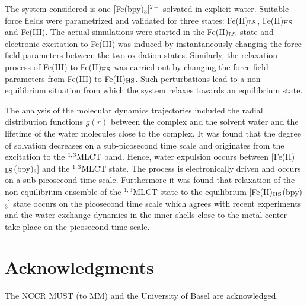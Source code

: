 \documentclass[journal=jacsat,manuscript=article]{achemso}
\begin{document}
The system considered is one [Fe(bpy)$_3$]$^{2+}$ solvated in explicit
water.\cite{das:2016} Suitable force fields were parametrized and
validated for three states: Fe(II)$\rm _{LS}$, Fe(II)$\rm _{HS}$ and
Fe(III). The actual simulations were started in the Fe(II)$\rm _{LS}$
state and electronic excitation to Fe(III) was induced by
instantaneously changing the force field parameters between the two
oxidation states. Similarly, the relaxation process of Fe(III) to
Fe(II)$\rm_{HS}$ was carried out by changing the force field
parameters from Fe(III) to Fe(II)$\rm _{HS}$. Such perturbations lead
to a non-equilibrium situation from which the system relaxes towards
an equilibrium state.

The analysis of the molecular dynamics trajectories included the
radial distribution functions $g(r)$ between the complex and the
solvent water and the lifetime of the water molecules close to the
complex. It was found\cite{das:2016} that the degree of solvation
decreases on a sub-picosecond time scale and originates from the
excitation to the $^{1,3}$MLCT band. Hence, water expulsion occurs
between [Fe(II)$_{\rm LS}$(bpy)$_3$] and the $^{1,3}$MLCT state. The
process is electronically driven and occurs on a sub-picosecond time
scale. Furthermore it was found that relaxation of the non-equilibrium
ensemble of the $^{1,3}$MLCT state to the equilibrium [Fe(II)$_{\rm
    HS}$(bpy)$_3$] state occurs on the picosecond time scale which
agrees with recent experiments\cite{Majed2015} and the water exchange
dynamics in the inner shells close to the metal center take place on
the picosecond time scale.

    
\section*{Acknowledgments}
The NCCR MUST (to MM) and the University of Basel are acknowledged.



\end{document}
